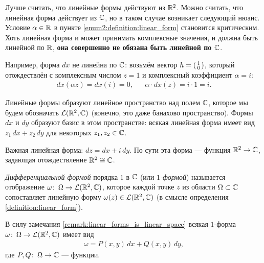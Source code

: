 \begin{remrk}
 Лучше считать, что линейные формы действуют из $\mathbb{R}^{2}$. Можно считать, что линейная форма действует из $\mathbb{C}$, но в таком случае возникает следующий нюанс. Условие $\alpha \in \mathbb{R}$ в пункте \ref{enum2:definition:linear_form} становится критическим. Хоть линейная форма и может принимать комплексные значения, и должна быть линейной по $\mathbb{R}$, \textbf{она совершенно не обязана быть линейной по $\mathbb{C}$}.

 Например, форма $dx$ не линейна по $\mathbb{C}$: возьмём вектор $h = \begin{psmallmatrix}
  1 \\ 0
 \end{psmallmatrix}$, который отождествлён с комплексным числом $z = 1$ и комплексный коэффициент $\alpha = i$:
 \begin{align*}
  dx(\alpha z) = dx(i) = 0, & &\alpha \cdot dx(z) = i \cdot 1 = i.
 \end{align*} 
\end{remrk}
\begin{remrk}
 \label{remark:linear_forms_is_linear_space}
 Линейные формы образуют линейное пространство над полем $\mathbb{C}$, которое мы будем обозначать $\mathcal{L}(\mathbb{R}^2, \mathbb{C})$ (конечно, это даже банахово пространство). Формы $dx$ и $dy$ образуют базис в этом пространстве: всякая линейная форма имеет вид $z_1\,dx + z_2\,dy$ для некоторых $z_1, z_2 \in \mathbb{C}$.
\end{remrk}
\begin{exmpl*}
 Важная линейная форма: $dz = dx + i\,dy$. По сути эта форма --- функция $\mathbb{R}^{2} \to \mathbb{C}$, задающая отождествление $\mathbb{R}^{2} \cong \mathbb{C}$.
\end{exmpl*}

\begin{df}
 \textit{Дифференциальной формой} порядка $1$ в $\mathbb{C}$ (или \textit{$1$-формой}) называется отображение $\omega \colon\, \Omega \to \mathcal{L}(\mathbb{R}^2, \mathbb{C})$, которое каждой точке $z$ из области $\Omega \subset \mathbb{C}$ сопоставляет линейную форму $\omega(z) \in \mathcal{L}(\mathbb{R}^2, \mathbb{C})$ (в смысле определения \ref{definition:linear_form}).
\end{df}
\begin{remrk*}
 В силу замечания \ref{remark:linear_forms_is_linear_space} всякая $1$-форма $\omega \colon\, \Omega \to \mathcal{L}(\mathbb{R}^2, \mathbb{C})$ имеет вид
 \begin{align}
  \label{equation:1-form}
  \omega = P(x,y)\,dx + Q(x,y)\,dy
 ,\end{align} где $P, Q \colon\, \Omega \to \mathbb{C}$ --- функции.
\end{remrk*}

